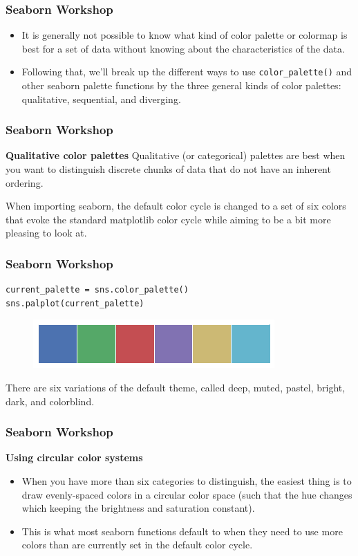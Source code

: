 \documentclass{beamer}
\begin{document}
\begin{frame}[fragile]
	\frametitle{Seaborn Workshop}
	\large
\begin{itemize}
\item It is generally not possible to know what kind of color palette or colormap is best for a set of data without knowing about the characteristics of the data.
\item Following that, we’ll break up the different ways to use \texttt{color\_palette()} and other seaborn palette functions by the three general kinds of color palettes: qualitative, sequential, and diverging.
\end{itemize}
\end{frame}
\begin{frame}[fragile]
\frametitle{Seaborn Workshop}
\large
\noindent \textbf{Qualitative color palettes}
Qualitative (or categorical) palettes are best when you want to distinguish discrete chunks of data that do not have an inherent ordering.

When importing seaborn, the default color cycle is changed to a set of six colors that evoke the standard matplotlib color cycle while aiming to be a bit more pleasing to look at.
\end{frame}
\begin{frame}[fragile]
	\frametitle{Seaborn Workshop}
	\large
\begin{verbatim}
current_palette = sns.color_palette()
sns.palplot(current_palette)
\end{verbatim}
\begin{figure}
\centering
\includegraphics[width=0.7\linewidth]{images/color_palettes_8_0}
\end{figure}

There are six variations of the default theme, called deep, muted, pastel, bright, dark, and colorblind.
\end{frame}
\begin{frame}[fragile]
\frametitle{Seaborn Workshop}
\large
\noindent \textbf{Using circular color systems}
\begin{itemize}
\item When you have more than six categories to distinguish, the easiest thing is to draw evenly-spaced colors in a circular color space (such that the hue changes which keeping the brightness and saturation constant). 
\item This is what most seaborn functions default to when they need to use more colors than are currently set in the default color cycle.
\end{itemize}

\end{frame}
\end{document}
